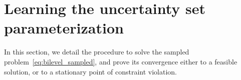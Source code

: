 \documentclass[11pt]{article}
\newcommand{\bsnote}[1]{\noindent\textcolor{red}{\texttt{Bartolomeo: #1}}}
\newcommand{\RC}[1]{\textcolor{black}{#1}}
\begin{document}
\section{Learning the uncertainty set parameterization}
\label{sec:learn}
In this section, we detail the procedure to solve the sampled problem~\eqref{eq:bilevel_sampled}, and prove its convergence either to a feasible solution, or to a stationary point of constraint violation. 

\end{document}

